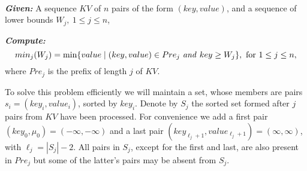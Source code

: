 \begin{problem}\label{p.msp}\ 

\noindent \emph{\bf Given:} A sequence $KV$ of $n$ pairs of the form $(key,value)$,
	and a sequence of lower bounds $W_j,\  1\leq j \leq n$, 


\noindent \emph{\bf Compute:} 
\begin{equation}
min_j(W_j)=\min \{value \mid (key,value)\in Pre_j \mbox{ \emph{and} } key \geq W_j\},  \mbox{ for }1\leq j \leq n, \label{e.min-m-v}
\end{equation}
where $Pre_j$ is the prefix of length $j$ of $KV$.
\end{problem}

To solve this problem efficiently we will maintain a set, whose members are 
pairs  $s_i=(key_{i}, value_{i})$, sorted by $key_i$.  
Denote by $S_j$ the sorted set formed after $j$ pairs
from $KV$ have been processed.
For convenience we add a first pair $(key_{0},\mu_{0})=(-\infty,-\infty)$
and a last pair
$(key_{\ell_j+1},value_{\ell_j+1})=(\infty,\infty)$, with $\ell_j=|S_j|-2$.
All pairs in $S_j$, except for the first and last, are also present in $Pre_j$ but some of the 
latter's pairs may be absent from $S_j$. 

